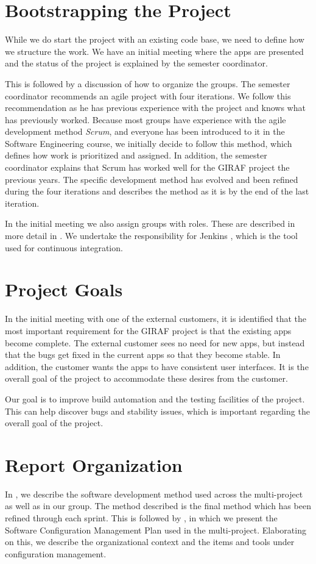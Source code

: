 \section{Bootstrapping the Project}
While we do start the project with an existing code base, we need to define how we structure the work. We have an initial meeting where the apps are presented and the status of the project is explained by the semester coordinator.

This is followed by a discussion of how to organize the groups. The semester coordinator recommends an agile project with four iterations. We follow this recommendation as he has previous experience with the project and knows what has previously worked. Because most groups have experience with the agile development method \emph{Scrum}, and everyone has been introduced to it in the Software Engineering course, we initially decide to follow this method, which defines how work is prioritized and assigned. In addition, the semester coordinator explains that Scrum has worked well for the GIRAF project the previous years. The specific development method has evolved and been refined during the four iterations and  describes the method as it is by the end of the last iteration.

In the initial meeting we also assign groups with roles. These are described in more detail in . We undertake the responsibility for Jenkins \cite{JenkinsWebsite}, which is the tool used for continuous integration.

\section{Project Goals}
In the initial meeting with one of the external customers, it is identified that the most important requirement for the GIRAF project is that the existing apps become complete. The external customer sees no need for new apps, but instead that the bugs get fixed in the current apps so that they become stable. In addition, the customer wants the apps to have consistent user interfaces. It is the overall goal of the project to accommodate these desires from the customer.

Our goal is to improve build automation and the testing facilities of the project. This can help discover bugs and stability issues, which is important regarding the overall goal of the project.

\section{Report Organization}
In , we describe the software development method used across the multi-project as well as in our group. The method described is the final method which has been refined through each sprint. This is followed by , in which we present the Software Configuration Management Plan used in the multi-project. Elaborating on this, we describe the organizational context and the items and tools under configuration management.

